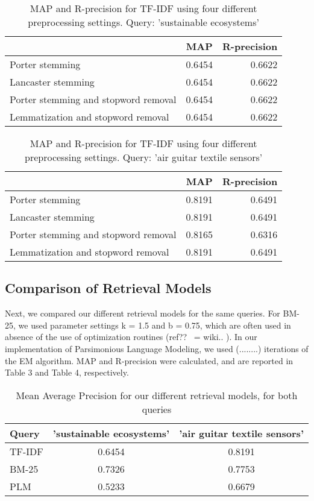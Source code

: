 \documentclass{article}
\begin{document}
\begin{table}
\begin{tabular}{|l|c|r|}
\hline
 & MAP & R-precision \\ \hline
Porter stemming & 0.6454 & 0.6622 \\ \hline
Lancaster stemming & 0.6454 & 0.6622 \\ \hline
Porter stemming and stopword removal & 0.6454 & 0.6622 \\ \hline
Lemmatization and stopword removal & 0.6454 & 0.6622 \\ \hline
\end{tabular}
\caption{MAP and R-precision for TF-IDF using four different preprocessing settings. Query: 'sustainable ecosystems'}
\end{table}
\begin{table}
\begin{tabular}{|l|c|r|}
\hline
 & MAP & R-precision \\ \hline
Porter stemming & 0.8191 & 0.6491 \\ \hline
Lancaster stemming & 0.8191 & 0.6491 \\ \hline
Porter stemming and stopword removal & 0.8165 & 0.6316 \\ \hline
Lemmatization and stopword removal & 0.8191 & 0.6491 \\ \hline
\end{tabular}
\caption{MAP and R-precision for TF-IDF using four different preprocessing settings. Query: 'air guitar textile sensors'} 
\end{table} 

\subsection*{Comparison of Retrieval Models}

Next, we compared our different retrieval models for the same queries. For BM-25, we used parameter settings k = 1.5 and b = 0.75, which are often used in absence of the use of optimization routines (ref?? ~= wiki.. ). In our implementation of Parsimonious Language Modeling, we used (........) iterations of the EM algorithm. MAP and R-precision were calculated, and are reported in Table 3 and Table 4, respectively.

\begin{table}[!ht]
\caption{Mean Average Precision for our different retrieval models, for both queries}
\begin{tabular}{|l|c|c|}
\hline
Query & 'sustainable ecosystems' & 'air guitar textile sensors' \\ \hline
TF-IDF & 0.6454 & 0.8191 \\ \hline
BM-25 & 0.7326 & 0.7753 \\ \hline
PLM & 0.5233 & 0.6679 \\ \hline
\end{tabular}
\end{table}
\end{document}
